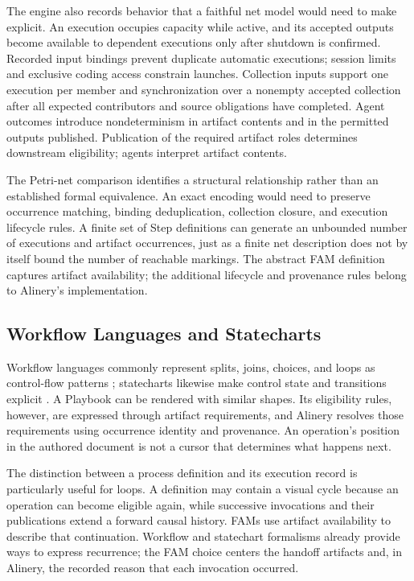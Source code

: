 \documentclass[letterpaper]{article}
\theoremstyle{definition}
\begin{document}
The engine also records behavior that a faithful net model would need to make
explicit. An execution occupies capacity while active, and its accepted
outputs become available to dependent executions only after shutdown is
confirmed. Recorded input bindings prevent duplicate automatic executions;
session limits and exclusive coding access constrain launches. Collection
inputs support one execution per member and synchronization over a nonempty
accepted collection after all expected contributors and source obligations
have completed. Agent outcomes introduce nondeterminism in artifact contents
and in the permitted outputs published. Publication of the required artifact
roles determines downstream eligibility; agents interpret artifact contents.

The Petri-net comparison identifies a structural relationship rather than an
established formal equivalence. An exact encoding would need to preserve
occurrence matching, binding deduplication, collection closure, and execution
lifecycle rules. A finite set of Step definitions can generate an unbounded
number of executions and artifact occurrences, just as a finite net description
does not by itself bound the number of reachable markings. The abstract FAM
definition captures artifact availability; the additional lifecycle and
provenance rules belong to Alinery's implementation.

\subsection{Workflow Languages and Statecharts}

Workflow languages commonly represent splits, joins, choices, and loops as
control-flow patterns \cite{vanderAalst2003workflow}; statecharts likewise make
control state and transitions explicit \cite{harel1987statecharts}. A Playbook
can be rendered with similar shapes. Its eligibility rules, however, are
expressed through artifact requirements, and Alinery resolves those
requirements using occurrence identity and provenance. An operation's position
in the authored document is not a cursor that determines what happens next.

The distinction between a process definition and its execution record is
particularly useful for loops. A definition may contain a visual cycle because
an operation can become eligible again, while successive invocations and their
publications extend a forward causal history. FAMs use artifact availability
to describe that continuation. Workflow and statechart formalisms already
provide ways to express recurrence; the FAM choice centers the handoff
artifacts and, in Alinery, the recorded reason that each invocation occurred.
\end{document}
